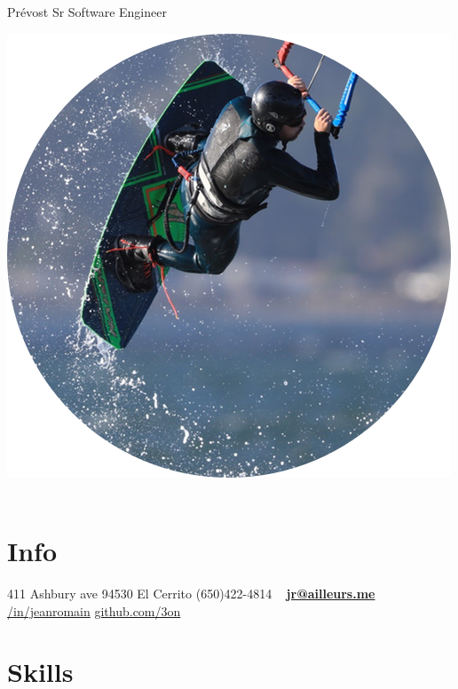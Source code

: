 \documentclass[]{friggeri-cv}
\begin{document}
 {Prévost}
      {Sr Software Engineer}
      

\begin{aside}
    \includegraphics[scale=0.24]{img/cv-kite.png}
  ~
  ~
  ~
  \section{Info}
        411 Ashbury ave
        94530 El Cerrito
        (650)422-4814
        ~
        \href{mailto:jr@ailleurs.me}{\textbf{jr@ailleurs.me}}
        \href{https://www.linkedin.com/in/jeanromain/}{/in/jeanromain}
        \href{https://github.com/3on}{github.com/3on}
  ~
  ~
  ~
  ~
  \section{Skills}
    ~
\end{aside}
~
~
~
~
~
\end{document}
